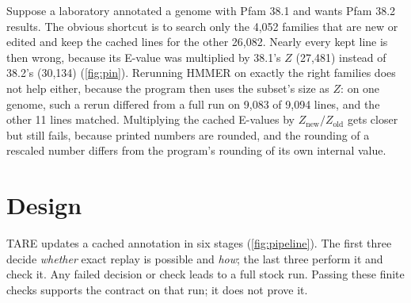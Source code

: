 \documentclass[letterpaper,twocolumn,10pt]{article}
\theoremstyle{definition}
\newcommand{\sys}{TARE\xspace}
\newcommand{\sys}{PARE\xspace}
\begin{document}
Suppose a laboratory annotated a genome with Pfam 38.1 and wants Pfam 38.2 results. The obvious shortcut is to
search only the 4{,}052 families that are new or edited and keep the cached lines for the other 26{,}082. Nearly
every kept line is then wrong, because its E-value was multiplied by 38.1's $Z$ (27{,}481) instead of 38.2's
(30{,}134) (\cref{fig:pin}). Rerunning HMMER on exactly the right families does not help either, because the program
then uses the subset's size as $Z$: on one genome, such a rerun differed from a full run on 9{,}083 of 9{,}094 lines,
and the other 11 lines matched. Multiplying the cached E-values by
$Z_{\text{new}}/Z_{\text{old}}$ gets closer but still fails, because printed numbers are rounded, and the rounding of
a rescaled number differs from the program's rounding of its own internal value.



\section{Design}
\label{sec:design}

\sys updates a cached annotation in six stages (\cref{fig:pipeline}). The first three decide \textit{whether} exact
replay is possible and \textit{how}; the last three perform it and check it. Any failed decision or check leads to a
full stock run. Passing these finite checks supports the contract on that run; it does not prove it.
\end{document}
